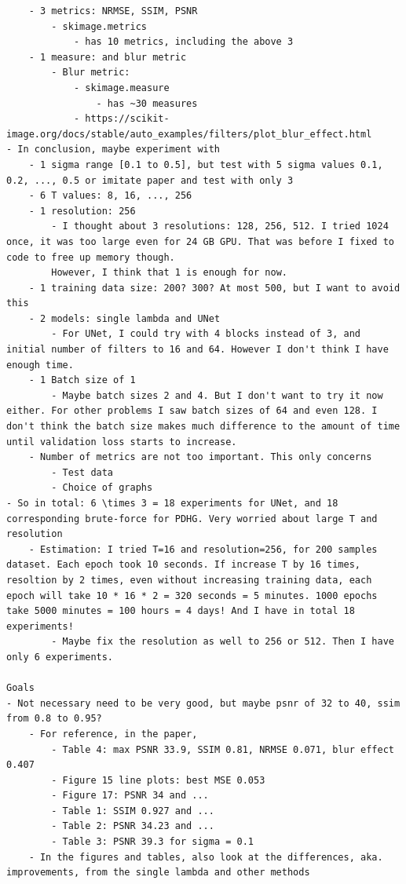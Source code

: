 \documentclass[12pt]{article}
\begin{document}
\begin{verbatim}
    - 3 metrics: NRMSE, SSIM, PSNR
        - skimage.metrics
            - has 10 metrics, including the above 3
    - 1 measure: and blur metric
        - Blur metric:
            - skimage.measure
                - has ~30 measures
            - https://scikit-image.org/docs/stable/auto_examples/filters/plot_blur_effect.html
- In conclusion, maybe experiment with
    - 1 sigma range [0.1 to 0.5], but test with 5 sigma values 0.1, 0.2, ..., 0.5 or imitate paper and test with only 3
    - 6 T values: 8, 16, ..., 256
    - 1 resolution: 256
        - I thought about 3 resolutions: 128, 256, 512. I tried 1024 once, it was too large even for 24 GB GPU. That was before I fixed to code to free up memory though.
        However, I think that 1 is enough for now.
    - 1 training data size: 200? 300? At most 500, but I want to avoid this
    - 2 models: single lambda and UNet
        - For UNet, I could try with 4 blocks instead of 3, and initial number of filters to 16 and 64. However I don't think I have enough time.
    - 1 Batch size of 1
        - Maybe batch sizes 2 and 4. But I don't want to try it now either. For other problems I saw batch sizes of 64 and even 128. I don't think the batch size makes much difference to the amount of time until validation loss starts to increase. 
    - Number of metrics are not too important. This only concerns
        - Test data
        - Choice of graphs
- So in total: 6 \times 3 = 18 experiments for UNet, and 18 corresponding brute-force for PDHG. Very worried about large T and resolution
    - Estimation: I tried T=16 and resolution=256, for 200 samples dataset. Each epoch took 10 seconds. If increase T by 16 times, resoltion by 2 times, even without increasing training data, each epoch will take 10 * 16 * 2 = 320 seconds = 5 minutes. 1000 epochs take 5000 minutes = 100 hours = 4 days! And I have in total 18 experiments!
        - Maybe fix the resolution as well to 256 or 512. Then I have only 6 experiments.

Goals
- Not necessary need to be very good, but maybe psnr of 32 to 40, ssim from 0.8 to 0.95?
    - For reference, in the paper, 
        - Table 4: max PSNR 33.9, SSIM 0.81, NRMSE 0.071, blur effect 0.407
        - Figure 15 line plots: best MSE 0.053
        - Figure 17: PSNR 34 and ...
        - Table 1: SSIM 0.927 and ...
        - Table 2: PSNR 34.23 and ...
        - Table 3: PSNR 39.3 for sigma = 0.1
    - In the figures and tables, also look at the differences, aka. improvements, from the single lambda and other methods
    

\end{verbatim}
\end{document}
